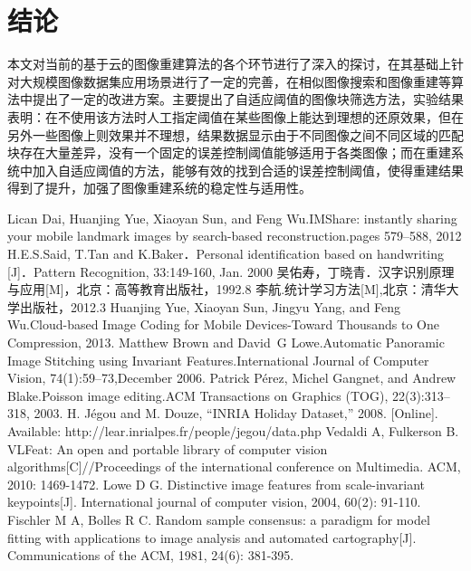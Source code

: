 \documentclass[UTF8]{csoarticle}
\begin{document}
\section{结论}

本文对当前的基于云的图像重建算法的各个环节进行了深入的探讨，在其基础上针对大规模图像数据集应用场景进行了一定的完善，在相似图像搜索和图像重建等算法中提出了一定的改进方案。主要提出了自适应阈值的图像块筛选方法，实验结果表明：在不使用该方法时人工指定阈值在某些图像上能达到理想的还原效果，但在另外一些图像上则效果并不理想，结果数据显示由于不同图像之间不同区域的匹配块存在大量差异，没有一个固定的误差控制阈值能够适用于各类图像；而在重建系统中加入自适应阈值的方法，能够有效的找到合适的误差控制阈值，使得重建结果得到了提升，加强了图像重建系统的稳定性与适用性。


\begin{thebibliography}{11} %
     Lican Dai, Huanjing Yue, Xiaoyan Sun, and Feng Wu.IMShare: instantly sharing your mobile landmark images by search-based reconstruction.pages 579--588, 2012
     H.E.S.Said, T.Tan and K.Baker．Personal identification based on handwriting [J]．Pattern Recognition, 33:149-160, Jan. 2000
     吴佑寿，丁晓青．汉字识别原理与应用[M]，北京：高等教育出版社，1992.8
     李航.统计学习方法[M],北京：清华大学出版社，2012.3
     Huanjing Yue, Xiaoyan Sun, Jingyu Yang, and Feng Wu.Cloud-based Image Coding for Mobile Devices-Toward Thousands to One Compression, 2013.
     Matthew Brown and David~G Lowe.Automatic Panoramic Image Stitching using Invariant Features.International Journal of Computer Vision, 74(1):59--73,December 2006.
     Patrick P{\'e}rez, Michel Gangnet, and Andrew Blake.Poisson image editing.ACM Transactions on Graphics (TOG), 22(3):313--318, 2003.
     H. Jégou and M. Douze, “INRIA Holiday Dataset,” 2008. [Online]. Available: http://lear.inrialpes.fr/people/jegou/data.php
     Vedaldi A, Fulkerson B. VLFeat: An open and portable library of computer vision algorithms[C]//Proceedings of the international conference on Multimedia. ACM, 2010: 1469-1472.
     Lowe D G. Distinctive image features from scale-invariant keypoints[J]. International journal of computer vision, 2004, 60(2): 91-110.
     Fischler M A, Bolles R C. Random sample consensus: a paradigm for model fitting with applications to image analysis and automated cartography[J]. Communications of the ACM, 1981, 24(6): 381-395.

\end{thebibliography}
\end{document}
